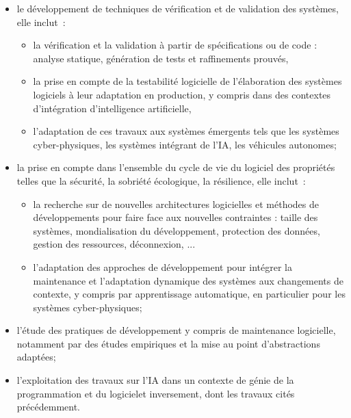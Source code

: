 \documentclass[11pt]{article}
\newcommand{\gpl}[0]{génie de la programmation et du logiciel}
\begin{document}
\begin{itemize}
\item le développement de techniques de vérification et de validation des systèmes, elle inclut~:
\begin{itemize}
\item la vérification et la validation à partir  de spécifications ou de code : analyse statique, génération de tests et raffinements prouvés,
\item la prise en compte de la testabilité logicielle de l'élaboration des systèmes logiciels à leur adaptation en production, y compris dans des contextes d'intégration d'intelligence artificielle, 
\item l'adaptation de ces travaux aux systèmes émergents tels que les systèmes cyber-physiques, les systèmes intégrant de l'IA, les véhicules autonomes;
\end{itemize}
\item la prise en compte dans l'ensemble du cycle de vie du logiciel des propriétés telles que la  sécurité, la sobriété écologique, la résilience, elle inclut~:
\begin{itemize}
\item la recherche sur de nouvelles architectures logicielles et méthodes de développements pour faire face aux nouvelles contraintes : taille des systèmes, mondialisation du développement, protection des données, gestion des ressources, déconnexion, ...
\item l'adaptation des approches de développement pour intégrer la maintenance et l'adaptation dynamique des systèmes aux changements de contexte, y compris par apprentissage automatique, en particulier pour les systèmes cyber-physiques;
\end{itemize}
\item l'étude des pratiques de développement y compris de maintenance logicielle, notamment par des études empiriques et la mise au point d'abstractions adaptées;
\item  l'exploitation des travaux sur l'IA dans un contexte de \gpl et inversement, dont les travaux cités précédemment.

\end{itemize}
\end{document}
